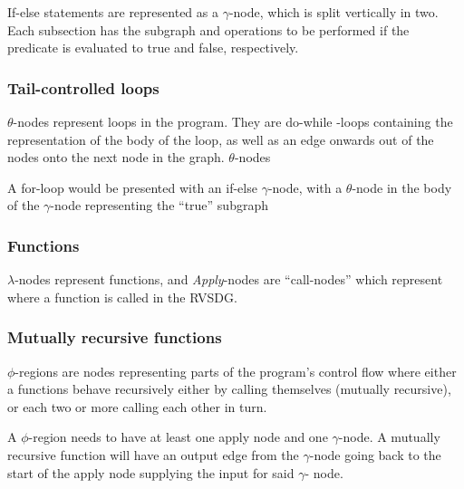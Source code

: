 If-else statements are represented as a $\gamma$-node, which is split vertically
in two. Each subsection has the subgraph and operations to be performed if the
predicate is evaluated to true and false, respectively.

\subsubsection{Tail-controlled loops}

\textit{$\theta$}-nodes represent loops in the program. They are do-while -loops
containing the representation of the body of the loop, as well as an edge
onwards out of the nodes onto the next node in the graph. $\theta$-nodes

A for-loop would be presented with an if-else $\gamma$-node, with a
$\theta$-node in the body of the $\gamma$-node representing the ``true''
subgraph

\subsubsection{Functions}

\textit{$\lambda$}-nodes represent functions, and \textit{Apply}-nodes are
``call-nodes'' which represent where a function is called in the RVSDG.

\subsubsection{Mutually recursive functions}

\textit{$\phi$}-regions are nodes representing parts of the program's
control flow where either a functions behave recursively either by calling
themselves (mutually recursive), or each two or more calling each other in turn.

A $\phi$-region needs to have at least one apply node and one $\gamma$-node. A
mutually recursive function will have an output edge from the $\gamma$-node
going back to the start of the apply node supplying the input for said $\gamma$-
node.
